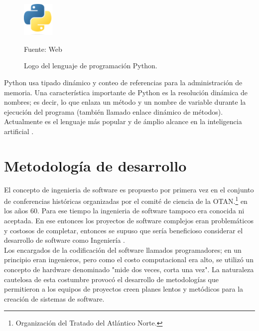 \begin{figure}[H]
    \begin{center}
        \includegraphics[width=1.5cm]{img/capitulo_2/python.png}
    \end{center}
    \begin{center}
        \caption{Logo del lenguaje de programación Python.}
        Fuente: Web
        \label{fig:python}
    \end{center}
\end{figure}

Python usa tipado dinámico y conteo de referencias para la administración de memoria. Una característica importante de Python es la resolución dinámica de nombres; es decir, lo que enlaza un método y un nombre de variable durante la ejecución del programa (también llamado enlace dinámico de métodos). Actualmente es el lenguaje más popular y de ámplio alcance en la inteligencia artificial \cite{python:popular}.\\

\section{Metodología de desarrollo}
El concepto de ingenieria de software es propuesto por primera vez en el conjunto de conferencias históricas organizadas por el comité de ciencia de la OTAN.\footnote{Organización del Tratado del Atlántico Norte.} en los años 60. Para ese tiempo la ingenieria de software tampoco era conocida ni aceptada. En ese entonces los proyectos de software complejos eran problemáticos y costosos de completar, entonces se supuso que sería beneficioso considerar el desarrollo de software como Ingeniería \cite{Ganis}.\\

Los encargados de la codificación del software llamados programadores; en un principio eran ingenieros, pero como el costo computacional era alto, se utilizó un concepto de hardware denominado "mide dos veces, corta una vez"\cite{Ganis}. La naturaleza cautelosa de esta costumbre provocó el desarrollo de metodologías que permitieron a los equipos de proyectos creen planes lentos y metódicos para la creación de sistemas de software.\\

